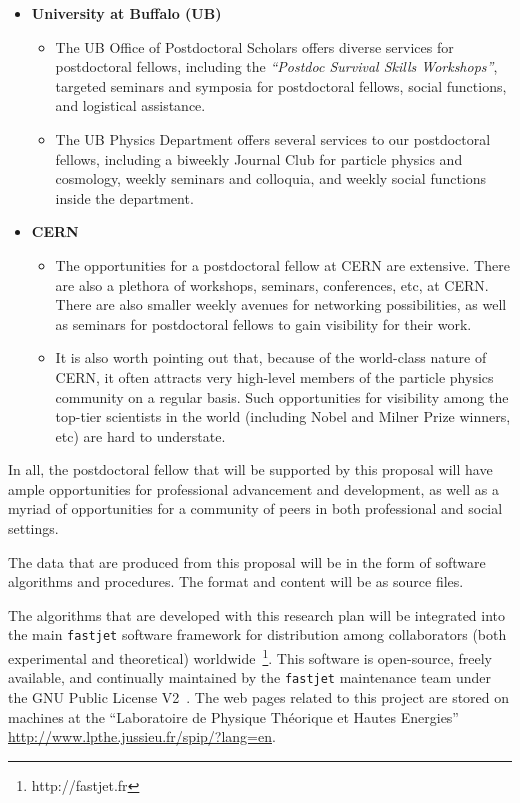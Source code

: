 \documentclass[times,11pt]{article}
\begin{document}
\begin{itemize}
\item {\bf University at Buffalo (UB)}
\begin{itemize}
\item The UB Office of Postdoctoral Scholars offers diverse services
  for postdoctoral fellows, including the {\sl ``Postdoc Survival
    Skills Workshops''}, targeted seminars and symposia for
  postdoctoral fellows, social functions, and logistical assistance. 
\item The UB Physics Department offers several services to our
  postdoctoral fellows, including a biweekly Journal Club for particle
  physics and cosmology, weekly seminars and colloquia, and weekly
  social functions inside the department. 
\end{itemize}
\item {\bf CERN}
\begin{itemize}
\item The opportunities for a postdoctoral fellow at CERN
  are extensive. There are also a plethora of workshops,
  seminars, conferences, etc, at CERN. There are also smaller weekly
  avenues for networking possibilities, as well as seminars for
  postdoctoral fellows to gain visibility for their work. 
\item It is also worth pointing out that, because of the world-class
  nature of CERN, it often attracts very high-level members of the
  particle physics community on a regular basis. Such opportunities
  for visibility among the top-tier scientists in the world (including
  Nobel and Milner Prize winners, etc) are hard to understate. 
\end{itemize}
\end{itemize}

In all, the postdoctoral fellow that will be supported by this
proposal will have ample opportunities for professional advancement
and development, as well as a myriad of opportunities for a community
of peers in both professional and social settings. 



\newpage
{}
\renewcommand{\thepage} {E--\arabic{page}}

The data that are produced from this proposal will be in the form of
software algorithms and procedures. The format and content will be as
source files. 

The algorithms that are developed with this research plan will be
integrated into the main {\tt fastjet} software framework for
distribution among collaborators (both experimental and theoretical)
worldwide~\footnote{http://fastjet.fr}. This software is open-source,
freely available, and continually maintained by the {\tt fastjet}
maintenance team under the GNU Public License V2~\cite{gnupl}. 
The web pages related to this project are stored on
machines at the ``Laboratoire de Physique Théorique et Hautes Energies'' 
\url{http://www.lpthe.jussieu.fr/spip/?lang=en}. 
\end{document}
